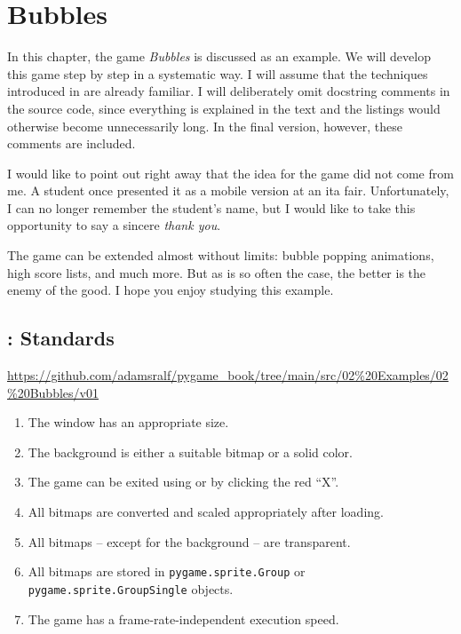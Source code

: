 \newpage
\section{Bubbles}

In this chapter, the game \emph{Bubbles} is discussed as an example. We will develop this game step by step in a systematic way. I will assume that the techniques introduced in  are already familiar. I will deliberately omit docstring comments in the source code, since everything is explained in the text and the listings would otherwise become unnecessarily long. In the final version, however, these comments are included.

\begin{hintbox}
	I would like to point out right away that the idea for the game did not come from me. A student once presented it as a mobile version at an \Gls{ita} fair. Unfortunately, I can no longer remember the student’s name, but I would like to take this opportunity to say a sincere \emph{thank you}.
\end{hintbox}

The game can be extended almost without limits: bubble popping animations, high score lists, and much more. But as is so often the case, the better is the enemy of the good. I hope you enjoy studying this example.



\subsection{: Standards}
\begin{diskbox}
	\url{https://github.com/adamsralf/pygame_book/tree/main/src/02%20Examples/02%20Bubbles/v01}
\end{diskbox}

\begin{enumerate}
	\item The window has an appropriate size.\label{reqStandardGröße}
	\item The background is either a suitable bitmap or a solid color.\label{reqStandardHintergrund}
	\item The game can be exited using \keys{\esc} or by clicking the red “X”.\label{reqStandardBeenden}
	\item All bitmaps are converted and scaled appropriately after loading.\label{reqStandardSprite}
	\item All bitmaps -- except for the background -- are transparent.\label{reqStandardTransparenz}
	\item All bitmaps are stored in \texttt{pygame.sprite.Group} or \texttt{py\-game\-.sprite\-.Group\-Single} objects.\label{reqStandardGruppe}
	\item The game has a frame-rate-independent execution speed.\label{reqStandardFps}
\end{enumerate}
\er

